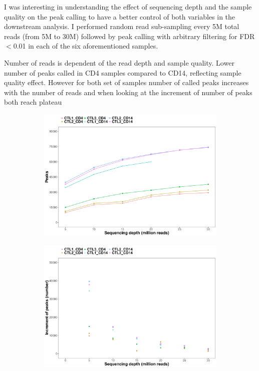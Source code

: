 I was interesting in understanding the effect of sequencing depth and the sample quality on the peak calling to have a better control of both variables in the downstream analysis. I performed random read sub-sampling every 5M total reads (from 5M to 30M) followed by peak calling with arbitrary filtering for FDR$<$0.01 in each of the six aforementioned samples. 

Number of reads is dependent of the read depth and sample quality. Lower number of peaks called in CD4 samples compared to CD14, reflecting sample quality effect. However for both set of samples number of called peaks increases with the number of reads and when looking at the increment of number of peaks both reach plateau


\begin{figure}[htbp]
\centering
\begin{subfigure}{0.45\textwidth}
\left
\includegraphics[width=\textwidth]{./Results1/pdfs/ATAC_Core_fresh_CD4_CD14_num_peaks_vs_depth}
\caption{\textbf{}}
\end{subfigure}%
\begin{subfigure}{0.45\textwidth}
\right
\includegraphics[width=\textwidth]{./Results1/pdfs/ATAC_Core_fresh_CD4_CD14_increment_num_peaks_vs_depth}

\end{subfigure}
\end{figure}

